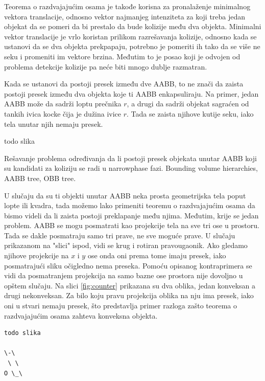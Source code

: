 \documentclass[a4paper]{article}
\begin{document}
{Teorema o razdvajajućim osama je takođe korisna za pronalaženje minimalnog vektora translacije, odnosno
vektor najmanjeg intenziteta za koji treba jedan objekat da se pomeri da bi prestalo da bude kolizije među dva objekta.
Minimalni vektor translacije je vrlo koristan prilikom razrešavanja kolizije, odnosno kada se ustanovi da
se dva objekta prekpapaju, potrebno je pomeriti ih tako da se više ne seku i promeniti im vektore brzina.
Međutim to je posao koji je odvojen od problema detekcije kolizije pa neće biti mnogo dublje razmatran.

Kada se ustanovi da postoji presek između dve AABB, to ne znači da zaista postoji presek između dva objekta
koje ti AABB enkapsuliraju. Na primer, jedan AABB može da sadrži loptu prečnika $r$, a drugi 
da sadrži objekat sagraćen od tankih ivica kocke čija je dužina ivice $r$. Tada se zaista njihove kutije 
seku, iako tela unutar njih nemaju presek.

todo slika

Rešavanje problema određivanja da li postoji presek objekata unutar AABB koji su kandidati za koliziju 
se radi u narrowphase fazi. Bounding volume hierarchies, AABB tree, OBB tree.


U slučaju da su ti objekti unutar AABB neka prosta geometrijska tela poput
lopte ili kvadra, tada možemo lako primeniti teoremu o razdvajajućim osama da bismo videli da li zaista 
postoji preklapanje među njima. Međutim, krije se jedan problem.
AABB se mogu posmatrati kao projekcije tela na sve tri ose u prostoru.
Tada se dakle posmatraju samo tri prave, ne sve moguće prave. 
U slučaju prikazanom na "slici" ispod, vidi se krug i rotiran pravougaonik. Ako gledamo njihove projekcije 
na $x$ i $y$ ose onda oni prema tome imaju presek, iako posmatrajući sliku očigledno nema preseka.
Pomoću opisanog kontraprimera se vidi da posmatranjem projekcija na samo bazne ose prostora nije dovoljno
u opštem slučaju. Na slici \ref{fig:counter} prikazana su dva oblika, jedan konveksan a drugi nekonveksan. 
Za bilo koju pravu projekcija oblika na nju ima presek, iako oni u stvari nemaju presek, što predstavlja 
primer razloga zašto teorema o razdvajajućim osama zahteva konveksna objekta.

\begin{verbatim}
todo slika

\-\
 \ \
O \_\
\end{verbatim}


}
\end{document}
